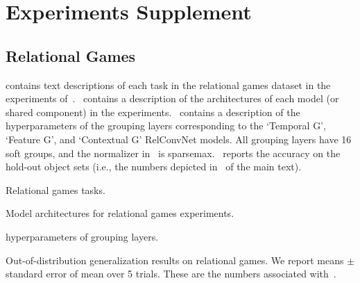 \section{Experiments Supplement}\label{sec:experiments_supplement}

\subsection{Relational Games}

 contains text descriptions of each task in the relational games dataset in the experiments of~.~ contains a description of the architectures of each model (or shared component) in the experiments.~ contains a description of the hyperparameters of the grouping layers corresponding to the `Temporal G', `Feature G', and `Contextual G' RelConvNet models. All grouping layers have 16 soft groups, and the normalizer in~ is sparsemax.~ reports the accuracy on the hold-out object sets (i.e., the numbers depicted in~ of the main text).

\begin{table}[h]
    \centering
    
    \caption{Relational games tasks.}\label{tab:relational_games_tasks}
\end{table}

\begin{table}[h]
    \centering
    
    \caption{Model architectures for relational games experiments.}\label{tab:relgames_architectures}
\end{table}

\begin{table}[h]
    \centering
    
    \caption{hyperparameters of grouping layers.}\label{tab:relgames_group_architectures}
\end{table}

\begin{table}[h]
    \centering
    
    \caption{Out-of-distribution generalization results on relational games. We report means $\pm$ standard error of mean over 5 trials. These are the numbers associated with~.}\label{tab:ood_generalization}
\end{table}

